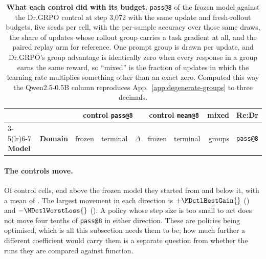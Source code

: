 \documentclass{article}
\newcommand{\1}{\mathbf 1}
\theoremstyle{remark}
\theoremstyle{definition}
\theoremstyle{plain}
\begin{document}
\begin{table}[t]
  \centering
  \caption{\textbf{What each control did with its budget.} \texttt{pass@8} of
  the frozen model against the Dr.GRPO control at step 3,072 with the same
  update and fresh-rollout budgets,
  five seeds per cell, with the per-sample accuracy over those same draws, the
  share of updates whose rollout group carries a task gradient at all, and the
  paired replay arm for reference. One prompt
  group is drawn per update, and Dr.GRPO's group advantage is identically zero
  when every response in a group earns the same reward, so ``mixed'' is the
  fraction of updates in which the learning rate multiplies something other
  than an exact zero. Computed this way the Qwen2.5-0.5B column reproduces
  App.~\ref{app:degenerate-groups} to three decimals.}
  \label{tab:control-learning-audit}
  \small
  \setlength{\tabcolsep}{5pt}
  \begin{tabular}{@{}llrrrrrrr@{}}
    \toprule
    & & \multicolumn{3}{c}{\textbf{control \texttt{pass@8}}}
      & \multicolumn{2}{c}{\textbf{control \texttt{mean@8}}}
      & \textbf{mixed} & \textbf{Re:Dr} \\
    \cmidrule(lr){3-5}\cmidrule(lr){6-7}
    \textbf{Model} & \textbf{Domain} & frozen & terminal & $\Delta$
      & frozen & terminal & groups & \texttt{pass@8} \\
    \midrule
    
  \end{tabular}
\end{table}

\paragraph{The controls move.}
Of \MDctlCells{} control cells, \MDctlGains{} end above the frozen model they
started from and \MDctlLosses{} below it, with a mean of \MDctlMeanDelta{}. The
largest movement in each direction is $+\MDctlBestGain{}$
(\MDctlBestGainCell{}) and $-\MDctlWorstLoss{}$ (\MDctlWorstLossCell{}). A
policy whose step size is too small to act does not move four tenths of
\texttt{pass@8} in either direction. These are policies being optimised, which
is all this subsection needs them to be; how much further a different
coefficient would carry them is a separate question from whether the runs
they are compared against function.
\end{document}
